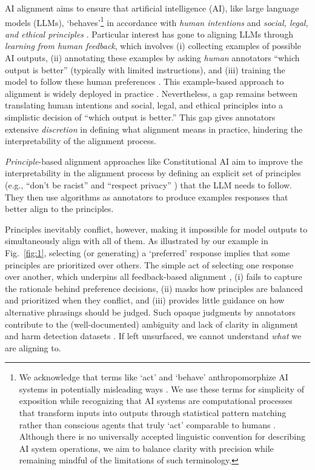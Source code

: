 \documentclass{article}
\begin{document}
AI alignment aims to ensure that artificial intelligence (AI), like large language models (LLMs), `behaves'\footnote{We acknowledge that terms like `act' and `behave' anthropomorphize AI systems in potentially misleading ways \cite{barrow2024anthropomorphism,inie2024ai}. We use these terms for simplicity of exposition while recognizing that AI systems are computational processes that transform inputs into outputs through statistical pattern matching rather than conscious agents that truly `act' comparable to humans \cite{yiu2024transmission}. Although there is no universally accepted linguistic convention for describing AI system operations, we aim to balance clarity with precision while remaining mindful of the limitations of such terminology.}
in accordance with \emph{human intentions} and \emph{social, legal, and ethical principles} \cite{ji2023ai}.
Particular interest has gone to aligning LLMs 
through \textit{learning from human feedback}, which involves (i) collecting examples of possible AI outputs, (ii) annotating these examples by asking \emph{human} annotators ``which output is better'' (typically with limited instructions), and (iii) training the model to follow these human preferences 
\cite{ouyang2022training}.
This example-based approach to alignment is widely deployed in practice \cite{ouyang2022training,ji2023ai,openaiGPT4TechnicalReport2024, Mesnard2024GemmaOM}. 
Nevertheless, a gap remains between translating human intentions and social, legal, and ethical principles into a simplistic decision of ``which output is better.'' This gap gives annotators extensive \emph{discretion} in defining what alignment means in practice, hindering the interpretability of the alignment process.


\emph{Principle}-based alignment approaches like Constitutional AI \cite{bai2022constitutional} aim to improve the interpretability in the alignment process by defining an explicit set of principles (e.g., ``don't be racist'' and ``respect privacy'' \cite{anthropic2024claude}) that the LLM needs to follow. They then use algorithms as annotators to produce examples responses that better align to the principles.

Principles inevitably conflict, however, making it impossible for model outputs to simultaneously align with all of them. 
As illustrated by our example in Fig.~\ref{fig:1}, selecting (or generating) a `preferred' response implies that some principles are prioritized over others. 
The simple act of selecting one response over another, which underpins all feedback-based alignment \cite{ji2023ai}, 
(i) fails to capture the rationale behind preference decisions, (ii) masks how principles are balanced and prioritized when they conflict, and (iii) provides little guidance on how alternative phrasings should be judged.
Such opaque judgments by annotators contribute to the (well-documented) ambiguity and lack of clarity in alignment and harm detection datasets \cite{blodgett2021stereotyping, shen2024towards, benAccontabilityForDatasets}.
If left unsurfaced, we cannot understand \textit{what} we are aligning to.
\end{document}
